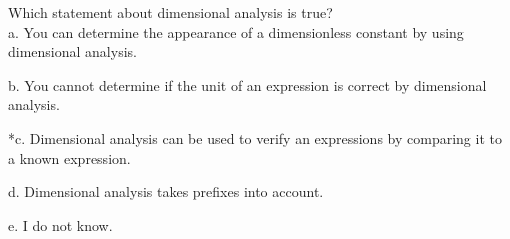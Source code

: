 
Which statement about dimensional analysis is true?\\

a. You can determine the appearance of a dimensionless constant by using dimensional analysis.

b. You cannot determine if the unit of an expression is correct by dimensional analysis.

*c. Dimensional analysis can be used to verify an expressions by comparing it to a known expression.

d. Dimensional analysis takes prefixes into account.

e. I do not know.\\
